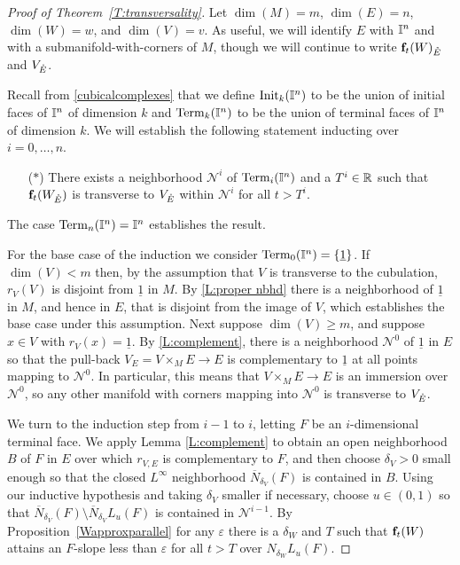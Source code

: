 \begin{proof}[Proof of Theorem~\ref{T:transversality}]
	Let $\dim(M) = m$, $\dim(E) = n$, $\dim(W) = w$, and $\dim(V) = v$.
	As useful, we will identify $E$ with $\mathbb{I}^n$ and with a submanifold-with-corners of $M$, though we will continue to write $\mathbf{f}_t(W)_{\mathring{E}}$ and $V_{\mathring{E}}$.

	Recall from \cref{cubicalcomplexes} that we define ${\rm Init}_k(\mathbb{I}^n)$ to be the union of initial faces of $\mathbb{I}^n$ of dimension $k$ and ${\rm Term}_k(\mathbb{I}^n)$ to be the union of terminal faces of $\mathbb{I}^n$ of dimension $k$.
	We will establish the following statement inducting over $i = 0, \dots, n$.
	\begin{itemize}
		\item[($\ast$)] There exists a neighborhood $\mathcal N^i$ of ${\rm Term}_{i}(\mathbb{I}^n)$ and a $T^i \in \mathbb{R}$ such that $\mathbf{f}_t(W_{\mathring{E}})$ is transverse to $V_{\mathring{E}}$ within $\mathcal N^i$ for all $t > T^i$.
	\end{itemize}
	The case $ {\rm Term}_{n}(\mathbb{I}^n) = \mathbb{I}^n$ establishes the result.

	For the base case of the induction we consider ${\rm Term}_0(\mathbb{I}^n) = \{\underline{1}\}$.
	If $\dim(V) < m$ then, by the assumption that $V$ is transverse to the cubulation, $r_V(V)$ is disjoint from $\underline{1}$ in $M$.
	By \cref{L:proper nbhd} there is a neighborhood of $\underline{1}$ in $M$, and hence in $E$, that is disjoint from the image of $V$, which establishes the base case under this assumption.
	Next suppose $\dim(V) \geq m$, and suppose $x \in V$ with $r_V(x) = \underline{1}$.
	By \cref{L:complement}, there is a neighborhood $\mathcal N^0$ of $\underline{1}$ in $E$ so that the pull-back $V_E = V \times_M E \to E$ is complementary to $\underline{1}$ at all points mapping to $\mathcal N^0$.
	In particular, this means that $V \times_M E \to E$ is an immersion over $\mathcal N^0$, so any other manifold with corners mapping into $\mathcal N^0$ is transverse to $V_{\mathring{E}}$.

	We turn to  the induction step  from $i-1$ to $i$, letting $F$ be an $i$-dimensional terminal face.
We apply Lemma \ref{L:complement} to obtain an open neighborhood $B$ of $F$ in $E$ over which $r_{V,E}$ is complementary to $F$, and then choose $\delta_V > 0$ small enough so that the closed $L^\infty$ neighborhood $\overline N_{\delta_V}(F)$  is contained in $B$.
Using our inductive hypothesis and taking $\delta_V$ smaller if necessary, choose $u \in (0, 1)$  so that $\overline N_{\delta_V}(F) \setminus \overline N_{\delta_V} L_u(F)$ is contained in $\mathcal N^{i-1}$.  By Proposition~\ref{Wapproxparallel} for any $\varepsilon$  there is a $\delta_W$ and $T$
such that $\mathbf{f}_t(W)$ attains an $F$-slope less than  $\varepsilon$  for all $t>T$ over $N_{\delta_W} L_u(F)$.


\end{proof}

